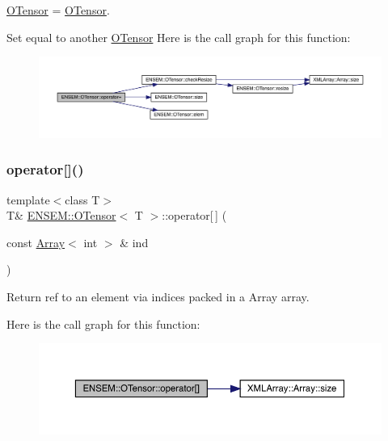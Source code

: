 \mbox{\hyperlink{classENSEM_1_1OTensor}{O\+Tensor}} = \mbox{\hyperlink{classENSEM_1_1OTensor}{O\+Tensor}}. 

Set equal to another \mbox{\hyperlink{classENSEM_1_1OTensor}{O\+Tensor}} Here is the call graph for this function\+:
\nopagebreak
\begin{figure}[H]
\begin{center}
\leavevmode
\includegraphics[width=350pt]{da/d8a/classENSEM_1_1OTensor_a96fac7277ac1df849789d53b761e5e68_cgraph}
\end{center}
\end{figure}
\mbox{\label{classENSEM_1_1OTensor_adbfded2bb2af9d68e0a040df0d19b2d6}} 
\subsubsection{\texorpdfstring{operator[]()}{operator[]()}\hspace{0.1cm}{\footnotesize\ttfamily [1/4]}}
{\footnotesize\ttfamily template$<$class T$>$ \\
T\& \mbox{\hyperlink{classENSEM_1_1OTensor}{E\+N\+S\+E\+M\+::\+O\+Tensor}}$<$ T $>$\+::operator\mbox{[}$\,$\mbox{]} (\begin{DoxyParamCaption}\item[{const \mbox{\hyperlink{classXMLArray_1_1Array}{Array}}$<$ int $>$ \&}]{ind }\end{DoxyParamCaption})\hspace{0.3cm}{\ttfamily [inline]}}



Return ref to an element via indices packed in a Array array. 

Here is the call graph for this function\+:
\nopagebreak
\begin{figure}[H]
\begin{center}
\leavevmode
\includegraphics[width=350pt]{da/d8a/classENSEM_1_1OTensor_adbfded2bb2af9d68e0a040df0d19b2d6_cgraph}
\end{center}
\end{figure}
\mbox{\label{classENSEM_1_1OTensor_adbfded2bb2af9d68e0a040df0d19b2d6}} 
